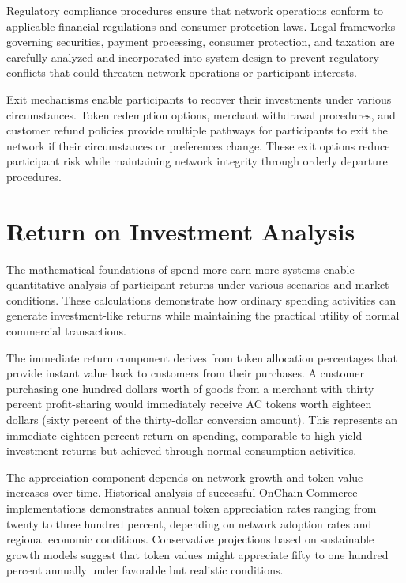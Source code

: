 \documentclass[
  Letterpaper,
]{scrbook}
\begin{document}
Regulatory compliance procedures ensure that network operations conform
to applicable financial regulations and consumer protection laws. Legal
frameworks governing securities, payment processing, consumer
protection, and taxation are carefully analyzed and incorporated into
system design to prevent regulatory conflicts that could threaten
network operations or participant interests.

Exit mechanisms enable participants to recover their investments under
various circumstances. Token redemption options, merchant withdrawal
procedures, and customer refund policies provide multiple pathways for
participants to exit the network if their circumstances or preferences
change. These exit options reduce participant risk while maintaining
network integrity through orderly departure procedures.

\section{Return on Investment
Analysis}\label{return-on-investment-analysis}

The mathematical foundations of spend-more-earn-more systems enable
quantitative analysis of participant returns under various scenarios and
market conditions. These calculations demonstrate how ordinary spending
activities can generate investment-like returns while maintaining the
practical utility of normal commercial transactions.

The immediate return component derives from token allocation percentages
that provide instant value back to customers from their purchases. A
customer purchasing one hundred dollars worth of goods from a merchant
with thirty percent profit-sharing would immediately receive AC tokens
worth eighteen dollars (sixty percent of the thirty-dollar conversion
amount). This represents an immediate eighteen percent return on
spending, comparable to high-yield investment returns but achieved
through normal consumption activities.

The appreciation component depends on network growth and token value
increases over time. Historical analysis of successful OnChain Commerce
implementations demonstrates annual token appreciation rates ranging
from twenty to three hundred percent, depending on network adoption
rates and regional economic conditions. Conservative projections based
on sustainable growth models suggest that token values might appreciate
fifty to one hundred percent annually under favorable but realistic
conditions.
\end{document}
